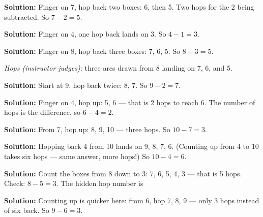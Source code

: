 \documentclass[12pt]{article}
\begin{document}




\textbf{Solution:} Finger on 7, hop back two boxes: 6, then 5. Two hops for
the 2 being subtracted. So $7-2=5$. 


\textbf{Solution:} Finger on 4, one hop back lands on 3. So $4-1=3$. 


\textbf{Solution:} Finger on 8, hop back three boxes: 7, 6, 5. So $8-3=5$.

\emph{Hops (instructor judges):} three arcs drawn from 8 landing on 7, 6,
and 5.


\textbf{Solution:} Start at 9, hop back twice: 8, 7. So $9-2=7$. 


\textbf{Solution:} Finger on 4, hop up: 5, 6 --- that is 2 hops to reach 6.
The number of hops is the difference, so $6-4=2$. 


\textbf{Solution:} From 7, hop up: 8, 9, 10 --- three hops. So $10-7=3$.


\textbf{Solution:} Hopping back 4 from 10 lands on 9, 8, 7, 6. (Counting up
from 4 to 10 takes six hops --- same answer, more hops!) So $10-4=6$.


\textbf{Solution:} Count the boxes from 8 down to 3: 7, 6, 5, 4, 3 --- that
is 5 hops. Check: $8-5=3$. The hidden hop number is 


\textbf{Solution:} Counting up is quicker here: from 6, hop 7, 8, 9 --- only
3 hops instead of six back. So $9-6=3$. 
\end{document}
